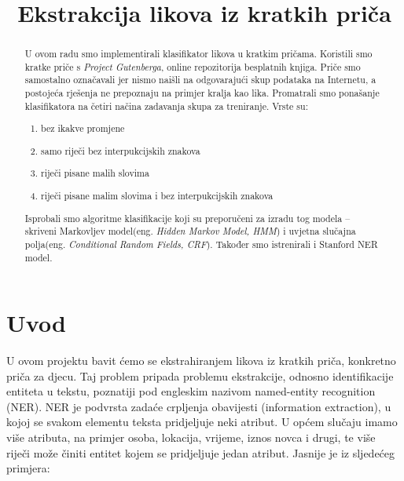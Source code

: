\documentclass[conference]{IEEEtran}
\begin{document}
\title{Ekstrakcija likova iz kratkih priča}
\author{
\and
{}}
\maketitle

\begin{abstract}
U ovom radu smo implementirali klasifikator likova u kratkim pričama. Koristili smo kratke priče s \textit{Project Gutenberga}, online repozitorija besplatnih knjiga. Priče smo samostalno označavali jer nismo naišli na odgovarajući skup podataka na Internetu, a postojeća rješenja ne prepoznaju na primjer kralja kao lika. Promatrali smo ponašanje klasifikatora na četiri načina zadavanja skupa za treniranje. Vrste su:

\begin{enumerate}
	\item bez ikakve promjene
	\item samo riječi bez interpukcijskih znakova
	\item riječi pisane malih slovima
	\item riječi pisane malim slovima i bez interpukcijskih znakova
\end{enumerate} 

Isprobali smo algoritme klasifikacije koji su preporučeni za izradu tog modela -- skriveni Markovljev model(eng. \textit{Hidden Markov Model, HMM}) i uvjetna slučajna polja(eng. \textit{Conditional Random Fields, CRF}). Također smo istrenirali i Stanford NER model.

\end{abstract}

\section{Uvod}
	
	U ovom projektu bavit ćemo se ekstrahiranjem likova iz kratkih priča, konkretno priča za djecu. Taj problem pripada problemu ekstrakcije, odnosno identifikacije entiteta u tekstu, poznatiji pod engleskim nazivom named-entity recognition (NER). NER je podvrsta zadaće crpljenja obavijesti (information extraction), u kojoj se svakom elementu teksta pridjeljuje neki atribut. U općem slučaju imamo više atributa, na primjer osoba, lokacija, vrijeme, iznos novca i drugi, te više riječi može činiti entitet kojem se pridjeljuje jedan atribut. Jasnije je iz sljedećeg primjera:\\
	
\end{document}
